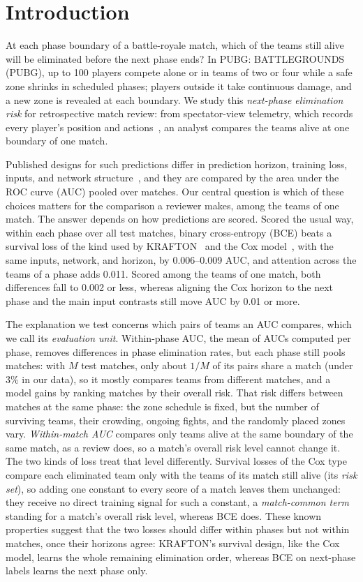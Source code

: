 \documentclass[sigconf,anonymous]{acmart}
\begin{document}
\section{Introduction}
\label{sec:introduction}
At each phase boundary of a battle-royale match, which of the teams still alive will be eliminated before the next phase ends? In PUBG: BATTLEGROUNDS (PUBG), up to 100 players compete alone or in teams of two or four while a safe zone shrinks in scheduled phases; players outside it take continuous damage, and a new zone is revealed at each boundary. We study this \emph{next-phase elimination risk} for retrospective match review: from spectator-view telemetry, which records every player's position and actions~\cite{PUBGAPI}, an analyst compares the teams alive at one boundary of one match.

Published designs for such predictions differ in prediction horizon, training loss, inputs, and network structure~\cite{Sagong25a,KRAFTON}, and they are compared by the area under the ROC curve (AUC) pooled over matches. Our central question is which of these choices matters for the comparison a reviewer makes, among the teams of one match. The answer depends on how predictions are scored. Scored the usual way, within each phase over all test matches, binary cross-entropy (BCE) beats a survival loss of the kind used by KRAFTON~\cite{KRAFTON} and the Cox model~\cite{Cox72}, with the same inputs, network, and horizon, by 0.006--0.009 AUC, and attention across the teams of a phase adds 0.011. Scored among the teams of one match, both differences fall to 0.002 or less, whereas aligning the Cox horizon to the next phase and the main input contrasts still move AUC by 0.01 or more.

The explanation we test concerns which pairs of teams an AUC compares, which we call its \emph{evaluation unit}. Within-phase AUC, the mean of AUCs computed per phase, removes differences in phase elimination rates, but each phase still pools matches: with $M$ test matches, only about $1/M$ of its pairs share a match (under 3\% in our data), so it mostly compares teams from different matches, and a model gains by ranking matches by their overall risk. That risk differs between matches at the same phase: the zone schedule is fixed, but the number of surviving teams, their crowding, ongoing fights, and the randomly placed zones vary. \emph{Within-match AUC} compares only teams alive at the same boundary of the same match, as a review does, so a match's overall risk level cannot change it. The two kinds of loss treat that level differently. Survival losses of the Cox type compare each eliminated team only with the teams of its match still alive (its \emph{risk set}), so adding one constant to every score of a match leaves them unchanged: they receive no direct training signal for such a constant, a \emph{match-common term} standing for a match's overall risk level, whereas BCE does. These known properties suggest that the two losses should differ within phases but not within matches, once their horizons agree: KRAFTON's survival design, like the Cox model, learns the whole remaining elimination order, whereas BCE on next-phase labels learns the next phase only.
\end{document}
